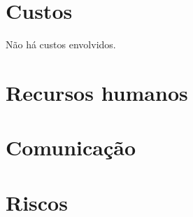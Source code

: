 \documentclass[
  12pt,
  openright,
  twoside,
  a4paper,
  english,
  brazil
]{abntex2}
\begin{document}
\section{Custos}\label{cap:custos}

Não há custos envolvidos.

\section{Recursos humanos}\label{cap:recursos_humanos}

\section{Comunicação}\label{cap:comunicacao}

\section{Riscos}\label{cap:riscos}

\postextual{}


\end{document}
